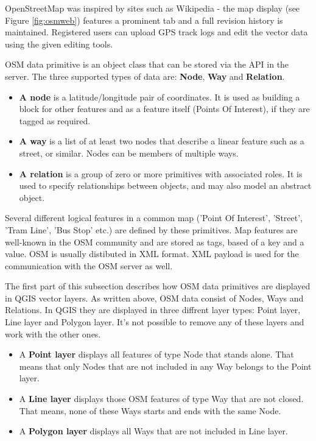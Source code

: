 OpenStreetMap was inspired by sites such as Wikipedia - the map display 
(see Figure \ref{fig:osmweb}) features a prominent  tab and a 
full revision history is maintained. Registered users can upload GPS track 
logs and edit the vector data using the given editing tools.

OSM data primitive is an object class that can be stored via the API in the
server. The three supported types of data are: \textbf{Node}, \textbf{Way} 
and \textbf{Relation}. 

\begin{itemize}
\item \textbf{A node} is a latitude/longitude pair of coordinates. It is 
used as building a block for other features and as a feature itself (Points 
Of Interest), if they are tagged as required. 
\item \textbf{A way} is a list of at least two nodes that describe a linear
feature such as a street, or similar. Nodes can be members of multiple ways.
\item \textbf{A relation} is a group of zero or more primitives with 
associated roles. It is used to specify relationships between objects, 
and may also model an abstract object. 
\end{itemize}

Several different logical features in a common map ('Point Of Interest',
'Street', 'Tram Line', 'Bus Stop' etc.) are defined by these primitives. 
Map features are well-known in the OSM community and are stored as tags, 
based of a key and a value. OSM is usually distibuted in XML format. XML 
payload is used for the communication with the OSM server as well.

\label{qgis-osm-connection}

The first part of this subsection describes how OSM data primitives 
are displayed in QGIS vector layers. As written above, OSM data consist of 
Nodes, Ways and Relations. In QGIS they are displayed in three diffrent 
layer types: Point layer, Line layer and Polygon layer. It's not possible 
to remove any of these layers and work with the other ones.

\begin{itemize}
\item A \textbf{Point layer} displays all features of type Node that stands 
alone. That means that only Nodes that are not included in any Way belongs 
to the Point layer.
\item A \textbf{Line layer} displays those OSM features of type Way that are 
not closed. That means, none of these Ways starts and ends with the 
same Node.
\item A \textbf{Polygon layer} displays all Ways that are not included in 
Line layer.
\end{itemize}

